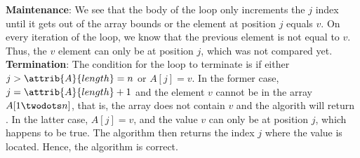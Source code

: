 \documentclass[8pt,a4paper]{article}
\begin{document}
\textbf{Maintenance}: We see that the body of the \While loop only increments the $j$ index
until it gets out of the array bounds or the element at position $j$ equals $v$. On
every iteration of the loop, we know that the previous element is not equal to $v$. Thus,
the $v$ element can only be at position $j$, which was not compared yet. \\

\textbf{Termination}: The condition for the \While loop to terminate is if either
$j > \attrib{A}{length} = n$ or $A[j] = v$. In the former case, $j = \attrib{A}{length} + 1$
and the element $v$ cannot be in the array $A[1 \twodots n]$, that is, the array does
not contain $v$ and the algorith will return . In the latter case, $A[j] = v$,
and the value $v$ can only be at position $j$, which happens to be true. The algorithm
then returns the index $j$ where the value is located. Hence, the algorithm is correct.
\end{document}
